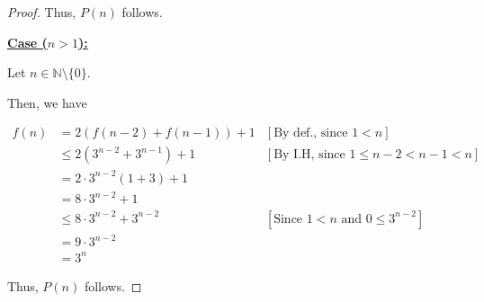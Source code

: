 \documentclass[12pt]{article}
\begin{document}
\begin{itemize}
\begin{proof}
        \bigskip

        Thus, $P(n)$ follows.

        \bigskip

        \underline{\textbf{Case ($n > 1$):}}

        \bigskip

        Let $n \in \mathbb{N} \setminus \{0\}$.

        \bigskip

        Then, we have

        \begin{align}
            f(n) &= 2(f(n-2) + f(n-1)) + 1 & [\text{By def., since $1 < n$}]\\
            &\leq 2(3^{n-2} + 3^{n-1}) + 1 & [\text{By I.H, since $1 \leq n-2 < n-1 < n$}]\\
            &= 2 \cdot 3^{n-2}(1 + 3) + 1\\
            &= 8 \cdot 3^{n-2} + 1 \\
            &\leq 8 \cdot 3^{n-2} + 3^{n-2} & [\text{Since $1 < n$ and $0 \leq 3^{n-2}$}]\\
            &= 9 \cdot 3^{n-2}\\
            &= 3^n
        \end{align}

        \bigskip

        Thus, $P(n)$ follows.
    \end{proof}
\end{itemize}

\bigskip
\end{document}
